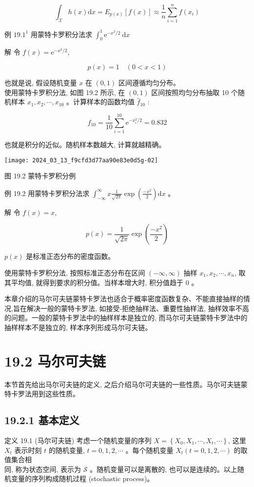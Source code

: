 \documentclass[10pt]{article}
\begin{document}
\begin{CJK*}{UTF8}{bsmi}
\begin{equation*}
\int_{\mathcal{X}} h(x) \mathrm{d} x=E_{p(x)}[f(x)] \approx \frac{1}{n} \sum_{i=1}^{n} f\left(x_{i}\right) \tag{19.5}
\end{equation*}


例 $19.1^{1}$ 用蒙特卡罗积分法求 $\int_{0}^{1} \mathrm{e}^{-x^{2} / 2} \mathrm{~d} x$

解 令 $f(x)=\mathrm{e}^{-x^{2} / 2}$,

$$
p(x)=1 \quad(0<x<1)
$$

也就是说, 假设随机变量 $x$ 在 $(0,1)$ 区间遵循均匀分布。\\
使用蒙特卡罗积分法, 如图 19.2 所示, 在 $(0,1)$ 区间按照均匀分布抽取 10 个随机样本 $x_{1}, x_{2}, \cdots, x_{10}$ 。计算样本的函数均值 $\hat{f}_{10}$ :

$$
\hat{f}_{10}=\frac{1}{10} \sum_{i=1}^{10} \mathrm{e}^{-x_{i}^{2} / 2}=0.832
$$

也就是积分的近似。随机样本数越大, 计算就越精确。

\begin{center}
\texttt{[image: 2024\_03\_13\_f9cfd3d77aa90e83e0d5g-02]}
\end{center}

图 19.2 蒙特卡罗积分例

例 19.2 用蒙特卡罗积分法求 $\int_{-\infty}^{\infty} x \frac{1}{\sqrt{2 \pi}} \exp \left(\frac{-x^{2}}{2}\right) \mathrm{d} x$ 。

解 令 $f(x)=x$,

$$
p(x)=\frac{1}{\sqrt{2 \pi}} \exp \left(\frac{-x^{2}}{2}\right)
$$

$p(x)$ 是标准正态分布的密度函数。

使用蒙特卡罗积分法, 按照标准正态分布在区间 $(-\infty, \infty)$ 抽样 $x_{1}, x_{2}, \cdots, x_{n}$, 取其平均值, 就得到要求的积分值。当样本增大时, 积分值趋于 0 。

本章介绍的马尔可夫链蒙特卡罗法也适合于概率密度函数复杂、不能直接抽样的情况,旨在解决一般的蒙特卡罗法, 如接受-拒绝抽样法、重要性抽样法, 抽样效率不高的问题。一般的蒙特卡罗法中的抽样样本是独立的, 而马尔可夫链蒙特卡罗法中的抽样样本不是独立的, 样本序列形成马尔可夫链。

\section*{19.2 马尔可夫链}
本节首先给出马尔可夫链的定义, 之后介绍马尔可夫链的一些性质。马尔可夫链蒙特卡罗法用到这些性质。

\subsection*{19.2.1 基本定义}
定义 19.1 (马尔可夫链) 考虑一个随机变量的序列 $X=\left\{X_{0}, X_{1}, \cdots, X_{t}, \cdots\right\}$, 这里 $X_{t}$ 表示时刻 $t$ 的随机变量, $t=0,1,2, \cdots$ 。每个随机变量 $X_{t}(t=0,1,2, \cdots)$ 的取值集合相\\
同, 称为状态空间, 表示为 $\mathcal{S}$ 。随机变量可以是离散的, 也可以是连续的。以上随机变量的序列构成随机过程 (stochastic process)。


\end{CJK*}
\end{document}
